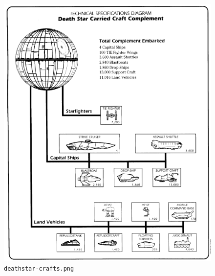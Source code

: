 \documentclass{article}
\begin{document}
\begin{figure}[H]
	\includegraphics[width=\linewidth]{resources/plans/deathstar-crafts.png}
	\caption{\texttt{deathstar-crafts.png}}
	\label{fig:deathstar-crafts}
\end{figure}
\end{document}
